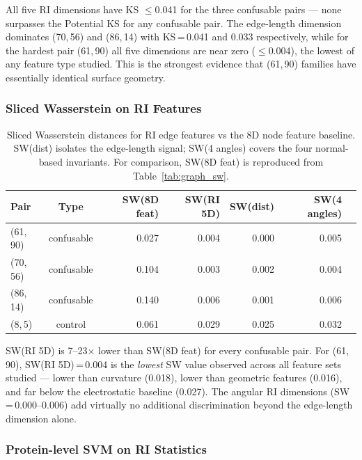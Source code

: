All five RI dimensions have KS $\leq$0.041 for the three confusable pairs
--- none surpasses the Potential KS for any confusable pair.
The edge-length dimension dominates (70,\,56) and (86,\,14) with KS\,=\,0.041
and 0.033 respectively, while for the hardest pair (61,\,90) all five dimensions
are near zero ($\leq$0.004), the lowest of any feature type studied.
This is the strongest evidence that (61,\,90) families have essentially identical
surface geometry.

\subsubsection{Sliced Wasserstein on RI Features}

\begin{table}[ht]
  \centering
  \caption{Sliced Wasserstein distances for RI edge features vs the 8D node
           feature baseline.
           SW(dist) isolates the edge-length signal;
           SW(4 angles) covers the four normal-based invariants.
           For comparison, SW(8D feat) is reproduced from
           Table~\ref{tab:graph_sw}.}
  \label{tab:sw_ri}
  \begin{tabular}{lcrrrrr}
    \toprule
    \textbf{Pair} & \textbf{Type}
      & \textbf{SW(8D feat)} & \textbf{SW(RI 5D)}
      & \textbf{SW(dist)} & \textbf{SW(4 angles)} \\
    \midrule
    (61,\,90) & confusable & 0.027 & 0.004 & 0.000 & 0.005 \\
    (70,\,56) & confusable & 0.104 & 0.003 & 0.002 & 0.004 \\
    (86,\,14) & confusable & 0.140 & 0.006 & 0.001 & 0.006 \\
    (8,\,5)   & control    & 0.061 & 0.029 & 0.025 & 0.032 \\
    \bottomrule
  \end{tabular}
\end{table}

SW(RI 5D) is 7--23$\times$ lower than SW(8D feat) for every confusable pair.
For (61,\,90), SW(RI 5D)\,=\,0.004 is the \emph{lowest} SW value observed
across all feature sets studied --- lower than curvature (0.018), lower than
geometric features (0.016), and far below the electrostatic baseline (0.027).
The angular RI dimensions (SW\,=\,0.000--0.006) add virtually no additional
discrimination beyond the edge-length dimension alone.

\subsubsection{Protein-level SVM on RI Statistics}
\label{sec:analysis:ri:svm}


